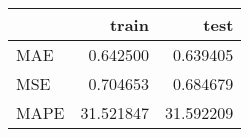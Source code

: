 \begin{tabular}{lrr}
\toprule
{} &      train &       test \\
\midrule
MAE  &   0.642500 &   0.639405 \\
MSE  &   0.704653 &   0.684679 \\
MAPE &  31.521847 &  31.592209 \\
\bottomrule
\end{tabular}
